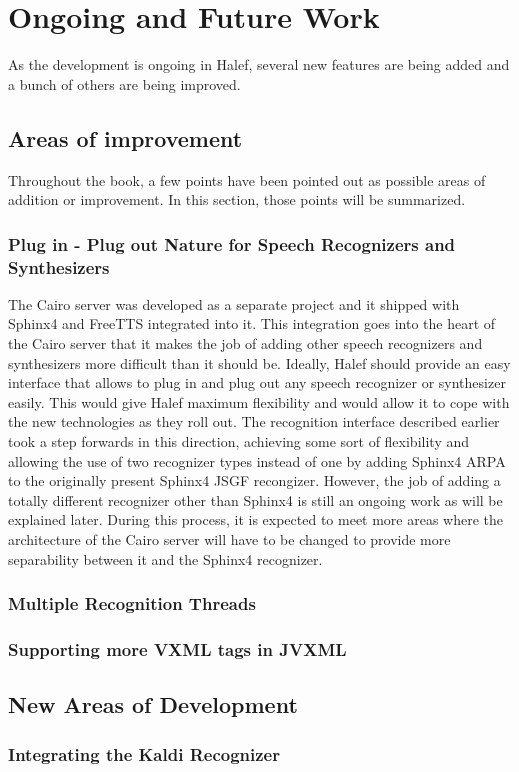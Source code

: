 \chapter{Ongoing and Future Work}
\label{chap:todo}
As the development is ongoing in Halef, several new features are being added and a bunch of others are being improved.

\section{Areas of improvement}
Throughout the book, a few points have been pointed out as possible areas of addition or improvement.
In this section, those points will be summarized.

\subsection{Plug in - Plug out Nature for Speech Recognizers and Synthesizers}
The Cairo server was developed as a separate project and it shipped with Sphinx4 and FreeTTS integrated into it.
This integration goes into the heart of the Cairo server that it makes the job of adding other speech recognizers and synthesizers more difficult than it should be.
Ideally, Halef should provide an easy interface that allows to plug in and plug out any speech recognizer or synthesizer easily.
This would give Halef maximum flexibility and would allow it to cope with the new technologies as they roll out.
The recognition interface described earlier took a step forwards in this direction, achieving some sort of flexibility and allowing the use of two recognizer types instead of one by adding Sphinx4 ARPA to the originally present Sphinx4 JSGF recongizer.
However, the job of adding a totally different recognizer other than Sphinx4 is still an ongoing work as will be explained later.
During this process, it is expected to meet more areas where the architecture of the Cairo server will have to be changed to provide more separability between it and the Sphinx4 recognizer.

\subsection{Multiple Recognition Threads}

\subsection{Supporting more VXML tags in JVXML}

\section{New Areas of Development}

\subsection{Integrating the Kaldi Recognizer}
